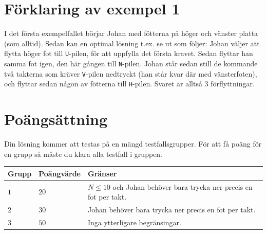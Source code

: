 \section*{Förklaring av exempel 1}
I det första exempelfallet börjar Johan med fötterna på höger och vänster platta (som alltid).
Sedan kan en optimal lösning t.ex. se ut som följer: Johan väljer att flytta höger fot till \texttt{U}-pilen, för att uppfylla det första kravet.
Sedan flyttar han samma fot igen, den här gången till \texttt{N}-pilen.
Johan står sedan still de kommande två takterna som kräver \texttt{V}-pilen nedtryckt (han står kvar där med vänsterfoten), och flyttar sedan någon av fötterna till \texttt{H}-pilen.
Svaret är alltså $3$ förflyttningar.

\section*{Poängsättning}
Din lösning kommer att testas på en mängd testfallsgrupper.
För att få poäng för en grupp så måste du klara alla testfall i gruppen.

\noindent
\begin{tabular}{| l | l | p{12cm} |}
  \hline
  Grupp & Poängvärde & Gränser \\ \hline
  $1$    & $20$        & $N \le 10$ och Johan behöver bara trycka ner precis en fot per takt. \\ \hline 
  $2$    & $30$        & Johan behöver bara trycka ner precis en fot per takt. \\ \hline
  $3$    & $50$        & Inga ytterligare begränsingar. \\ \hline 
\end{tabular}

